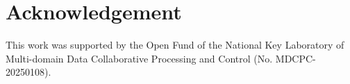 \documentclass{ccjnl}
\begin{document}
\section*{Acknowledgement}

This work was supported by the Open Fund of the National Key Laboratory of Multi-domain Data Collaborative Processing and Control (No. MDCPC-20250108).
















\end{document}
